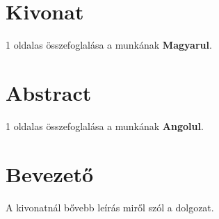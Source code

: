 \chapter*{Kivonat}
1 oldalas összefoglalása a munkának \textbf{Magyarul}.

\chapter*{Abstract}
1 oldalas összefoglalása a munkának \textbf{Angolul}.

\chapter*{Bevezető}
A kivonatnál bővebb leírás miről szól a dolgozat.










